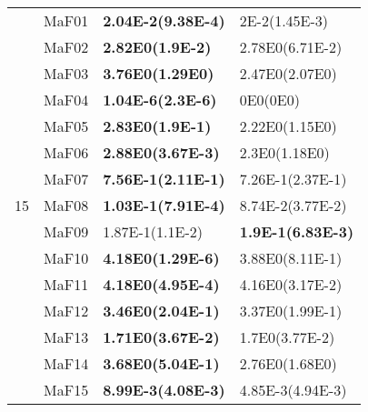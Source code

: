 \documentclass[]{article}
\begin{document}
\begin{table}
\begin{footnotesize}
\begin{tabular}{|l|l|l|l|}
\multirow{15}{*}{15} & MaF01 & \cellcolor{gray95} {\bf 2.04E-2(9.38E-4)} & \cellcolor{gray95} 2E-2(1.45E-3)\\
 & MaF02 & \cellcolor{gray95} {\bf 2.82E0(1.9E-2)} & 2.78E0(6.71E-2)\\
 & MaF03 & \cellcolor{gray95} {\bf 3.76E0(1.29E0)} & \cellcolor{gray95} 2.47E0(2.07E0)\\
 & MaF04 & \cellcolor{gray95} {\bf 1.04E-6(2.3E-6)} & \cellcolor{gray95} 0E0(0E0)\\
 & MaF05 & \cellcolor{gray95} {\bf 2.83E0(1.9E-1)} & \cellcolor{gray95} 2.22E0(1.15E0)\\
 & MaF06 & \cellcolor{gray95} {\bf 2.88E0(3.67E-3)} & \cellcolor{gray95} 2.3E0(1.18E0)\\
 & MaF07 & \cellcolor{gray95} {\bf 7.56E-1(2.11E-1)} & \cellcolor{gray95} 7.26E-1(2.37E-1)\\
 & MaF08 & \cellcolor{gray95} {\bf 1.03E-1(7.91E-4)} & \cellcolor{gray95} 8.74E-2(3.77E-2)\\
 & MaF09 & \cellcolor{gray95} 1.87E-1(1.1E-2) & \cellcolor{gray95} {\bf 1.9E-1(6.83E-3)}\\
 & MaF10 & \cellcolor{gray95} {\bf 4.18E0(1.29E-6)} & 3.88E0(8.11E-1)\\
 & MaF11 & \cellcolor{gray95} {\bf 4.18E0(4.95E-4)} & 4.16E0(3.17E-2)\\
 & MaF12 & \cellcolor{gray95} {\bf 3.46E0(2.04E-1)} & \cellcolor{gray95} 3.37E0(1.99E-1)\\
 & MaF13 & \cellcolor{gray95} {\bf 1.71E0(3.67E-2)} & \cellcolor{gray95} 1.7E0(3.77E-2)\\
 & MaF14 & \cellcolor{gray95} {\bf 3.68E0(5.04E-1)} & \cellcolor{gray95} 2.76E0(1.68E0)\\
 & MaF15 & \cellcolor{gray95} {\bf 8.99E-3(4.08E-3)} & 4.85E-3(4.94E-3)\\
\hline
\end{tabular}
\end{footnotesize}
\end{table}
\end{document}

